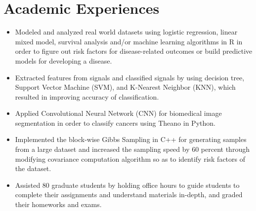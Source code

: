 \documentclass[10pt,letterpaper,sans]{moderncv}        %
\begin{document}
\section{Academic Experiences}
\vspace{1pt}

{
\begin{itemize}
\item Modeled and analyzed real world datasets using logistic regression, linear mixed model, survival analysis
and/or machine learning algorithms in R in order to figure out risk factors for disease-related outcomes or build predictive models for developing a disease.
\end{itemize}
}
\vspace{3pt}

{
\begin{itemize}
\item Extracted features from signals and classified signals by using decision tree, Support Vector Machine
(SVM), and K-Nearest Neighbor (KNN), which resulted in improving accuracy of classification.
\item Applied Convolutional Neural Network (CNN) for biomedical image segmentation in order to classify cancers
 using Theano in Python.
\end{itemize}
}
\vspace{3pt}

{
\begin{itemize}
\item Implemented the block-wise Gibbs Sampling in C++ for generating samples from a large dataset and
increased the sampling speed by 60 percent through modifying covariance computation algorithm so as to identify risk factors of the dataset.
\end{itemize}
}
\vspace{3pt}

{
\begin{itemize}
\item Assisted 80 graduate students by holding office hours to guide students to complete their assignments and understand materials in-depth, and graded their homeworks and exams.
\end{itemize}
}
\vspace{3pt}
\end{document}
